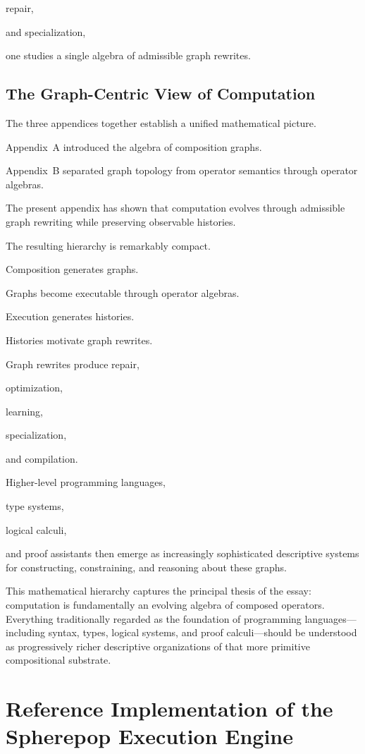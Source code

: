 \documentclass[12pt,oneside]{article}
\begin{document}
repair,

and specialization,

one studies a single algebra of admissible graph rewrites.

\subsection{The Graph-Centric View of Computation}

The three appendices together establish a unified mathematical picture.

Appendix~A introduced the algebra of composition graphs.

Appendix~B separated graph topology from operator semantics through operator algebras.

The present appendix has shown that computation evolves through admissible graph rewriting while preserving observable histories.

The resulting hierarchy is remarkably compact.

Composition generates graphs.

Graphs become executable through operator algebras.

Execution generates histories.

Histories motivate graph rewrites.

Graph rewrites produce repair,

optimization,

learning,

specialization,

and compilation.

Higher-level programming languages,

type systems,

logical calculi,

and proof assistants then emerge as increasingly sophisticated descriptive systems for constructing, constraining, and reasoning about these graphs.

This mathematical hierarchy captures the principal thesis of the essay: computation is fundamentally an evolving algebra of composed operators. Everything traditionally regarded as the foundation of programming languages—including syntax, types, logical systems, and proof calculi—should be understood as progressively richer descriptive organizations of that more primitive compositional substrate.

\section{Reference Implementation of the Spherepop Execution Engine}
\end{document}
